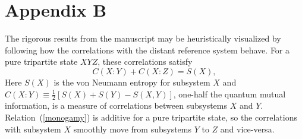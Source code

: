 \documentclass[aps,prl,amsmath,amssymb,floatfix,12pt]{revtex4}
\begin{document}
\section{Appendix B}
\label{heuristic}

The rigorous results from the manuscript may be heuristically visualized
by following how the correlations with the distant reference system
behave. For a pure tripartite state $XYZ$, these correlations satisfy
\begin{equation}
C(X\!:\!Y)+C(X\!:\!Z) = S(X), \label{monogamy}
\end{equation}
Here $S(X)$ is the von Neumann entropy for subsystem $X$ and
$C(X\!:\!Y)\equiv\frac{1}{2}[S(X)+S(Y)-S(X,Y)]$, one-half the quantum
mutual information, is a measure of correlations between subsystems
$X$ and $Y$. Relation~(\ref{monogamy}) is additive for a pure
tripartite state, so the correlations with subsystem $X$ smoothly
move from subsystems $Y$ to $Z$ and vice-versa.
\end{document}
